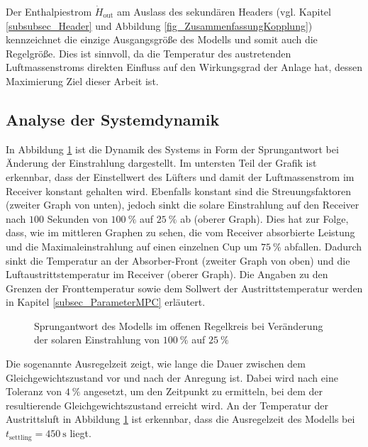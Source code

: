 Der Enthalpiestrom $\dot{H}_{\mathrm{out}}$ am Auslass des sekundären Headers (vgl. Kapitel \ref{subsubsec_Header} und Abbildung \ref{fig_ZusammenfassungKopplung}) kennzeichnet die einzige Ausgangsgröße des Modells und somit auch die Regelgröße.
Dies ist sinnvoll, da die Temperatur des austretenden Luftmassenstroms direkten Einfluss auf den Wirkungsgrad der Anlage hat, dessen Maximierung Ziel dieser Arbeit ist.

\subsection{Analyse der Systemdynamik} \label{subsec_Systemdynamik}
In Abbildung \ref{fig_Sprungantwort} ist die Dynamik des Systems in Form der Sprungantwort bei Änderung der Einstrahlung dargestellt.
Im untersten Teil der Grafik ist erkennbar, dass der Einstellwert des Lüfters und damit der Luftmassenstrom im Receiver konstant gehalten wird.
Ebenfalls konstant sind die Streuungsfaktoren (zweiter Graph von unten), jedoch sinkt die solare Einstrahlung auf den Receiver nach $100$ Sekunden von $\SI{100}{\percent}$ auf $\SI{25}{\percent}$ ab (oberer Graph).
Dies hat zur Folge, dass, wie im mittleren Graphen zu sehen, die vom Receiver absorbierte Leistung und die Maximaleinstrahlung auf einen einzelnen Cup um $\SI{75}{\percent}$ abfallen.
Dadurch sinkt die Temperatur an der Absorber-Front (zweiter Graph von oben) und die Luftaustrittstemperatur im Receiver (oberer Graph).
Die Angaben zu den Grenzen der Fronttemperatur sowie dem Sollwert der Austrittstemperatur werden in Kapitel \ref{subsec_ParameterMPC} erläutert.

\begin{figure}[h!]
    \centering
    \setlength{\fboxsep}{1pt}
    \setlength{\fboxrule}{1pt}
    \caption[Sprungantwort des Modells im offenen Regelkreis bei Veränderung der solaren Einstrahlung von $\SI{100}{\percent}$ auf $\SI{25}{\percent}$]{Sprungantwort des Modells im offenen Regelkreis bei Veränderung der solaren Einstrahlung von $\SI{100}{\percent}$ auf $\SI{25}{\percent}$}
    \label{fig_Sprungantwort}
\end{figure}

Die sogenannte Ausregelzeit zeigt, wie lange die Dauer zwischen dem Gleichgewichtszustand vor und nach der Anregung ist.
Dabei wird nach \cite[S.223]{Zacher} eine Toleranz von $\SI{4}{\percent}$ angesetzt, um den Zeitpunkt zu ermitteln, bei dem der resultierende Gleichgewichtszustand erreicht wird.
An der Temperatur der Austrittsluft in Abbildung \ref{fig_Sprungantwort} ist erkennbar, dass die Ausregelzeit des Modells bei $t_{\mathrm{settling}} = \SI{450}{\second}$ liegt.

